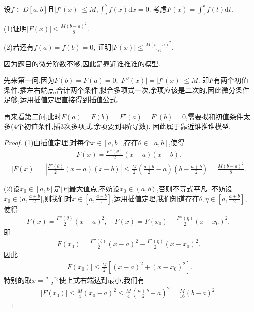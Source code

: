 \documentclass[../../main.tex]{subfiles}%
\begin{document}
\begin{example}
设$f \in D[a,b]$且$|f'(x)| \leqslant M, \int_a^b f(x)\mathrm{d}x = 0$. 考虑$F(x) = \int_a^x f(t)\mathrm{d}t$. 

(1)证明$|F(x)| \leqslant \frac{M(b-a)^2}{8}$. 

(2)若还有$f(a) = f(b) = 0$, 证明$|F(x)| \leqslant \frac{M(b-a)^2}{16}$.
\end{example}
\begin{note}
因为题目的微分阶数不够,因此是靠近谁推谁的模型.

先来第一问,因为$F(b) = F(a) = 0, |F''(x)| = |f'(x)| \leqslant M$. 即$F$有两个初值条件,插左右端点,合计两个条件,拟合多项式一次,余项应该是二次的,因此微分条件足够,运用插值定理直接得到插值公式.

再来看第二问,此时$F(a) = F(b) = F'(a) = F'(b) = 0$,需要拟和初值条件太多(4个初值条件,插3次多项式,余项要到4阶导数). 因此属于靠近谁推谁模型.
\end{note}
\begin{proof}

(1)由插值定理,对每个$x \in [a,b]$,存在$\theta \in [a,b]$,使得
\begin{align*}
F(x) = \frac{F''(\theta)}{2}(x-a)(x-b).
\end{align*}
\begin{align*}
|F(x)| = \left| \frac{F''(\theta)}{2}(x-a)(x-b) \right| \leqslant \frac{M}{2} \left( \frac{a+b}{2} - a \right) \left( b - \frac{a+b}{2} \right) = \frac{M(b-a)^2}{8}.
\end{align*}

(2)设$x_0 \in [a,b]$是$|F|$最大值点,不妨设$x_0 \in (a,b)$,否则不等式平凡.
不妨设$x_0 \in (a, \frac{a+b}{2}]$,则我们对$x \in [a, \frac{a+b}{2}]$,运用插值定理,我们知道存在$\theta, \eta \in [a, \frac{a+b}{2}]$,使得
\begin{align*}
F(x) = \frac{F''(\theta)}{2}(x-a)^2, \quad F(x) = F(x_0) + \frac{F''(\eta)}{2}(x-x_0)^2,
\end{align*}
即
\begin{align*}
F(x_0) = \frac{F''(\theta)}{2}(x-a)^2 - \frac{F''(\eta)}{2}(x-x_0)^2.
\end{align*}
因此
\begin{align*}
|F(x_0)| \leqslant \frac{M}{2} \left[ (x-a)^2 + (x-x_0)^2 \right].
\end{align*}
特别的取$x = \frac{a+x_0}{2}$使上式右端达到最小,我们有
\begin{align*}
|F(x_0)| \leqslant \frac{M}{4}(x_0 - a)^2 \leqslant \frac{M}{4} \left( \frac{a+b}{2} - a \right)^2 = \frac{M}{16}(b-a)^2.
\end{align*}

\end{proof}
\end{document}
